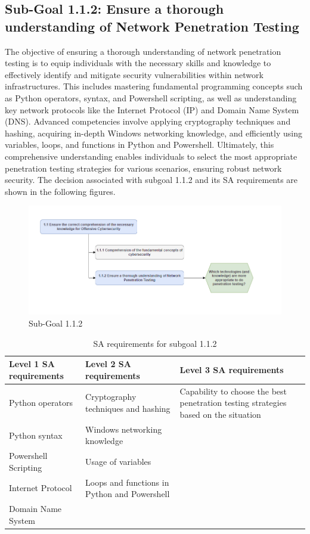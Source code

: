 \subsection{Sub-Goal 1.1.2: Ensure a thorough understanding of Network Penetration Testing}
The objective of ensuring a thorough understanding of network penetration testing is to equip individuals with the necessary skills and knowledge to effectively identify and mitigate security vulnerabilities within network infrastructures. This includes mastering fundamental programming concepts such as Python operators, syntax, and Powershell scripting, as well as understanding key network protocols like the Internet Protocol (IP) and Domain Name System (DNS). Advanced competencies involve applying cryptography techniques and hashing, acquiring in-depth Windows networking knowledge, and efficiently using variables, loops, and functions in Python and Powershell. Ultimately, this comprehensive understanding enables individuals to select the most appropriate penetration testing strategies for various scenarios, ensuring robust network security.
The decision associated with subgoal 1.1.2 and its SA requirements are shown in the following figures.
\begin{figure}[H]
    \centering
    \includegraphics[width=\textwidth]{./assets/subgoal_1.1.2.png}
    \caption{Sub-Goal 1.1.2}
    \label{fig:subgoal_1.1.2}
\end{figure}

\begin{table}[H]
    \begin{center}
    \begin{tabular}{ | m{5cm} | m{5cm}| m{5cm} | } 
      \hline
      \textbf{Level 1 SA requirements} & \textbf{Level 2 SA requirements}  & \textbf{Level 3 SA requirements}  \\ 
      \hline
      Python operators & Cryptography techniques and hashing & Capability to choose the best penetration testing strategies based on the situation\\ 
      \hline
      Python syntax & Windows networking knowledge & \\ 
      \hline
      Powershell Scripting & Usage of variables & \\ 
      \hline
      Internet Protocol & Loops and functions in Python and Powershell  & \\ 
      \hline
      Domain Name System &  & \\ 
      \hline
    \end{tabular}
    \end{center}
    \caption{SA requirements for subgoal 1.1.2}
    \end{table}

